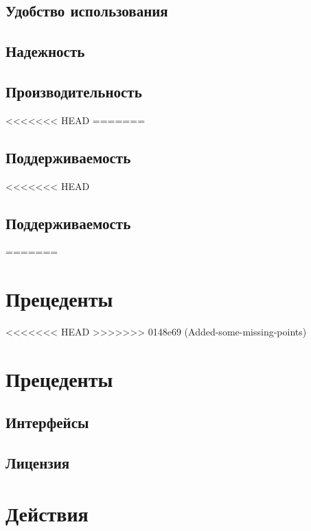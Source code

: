 \documentclass{article}
\begin{document}
\subsection{Удобство использования}


\subsection{Надежность}


\subsection{Производительность}

<<<<<<< HEAD
=======

\subsection{Поддерживаемость}


<<<<<<< HEAD
\subsection{Поддерживаемость}

=======
\section{Прецеденты}
<<<<<<< HEAD
>>>>>>> 0148e69 (Added-some-missing-points)

\section{Прецеденты}
\subsection{Интерфейсы}


\subsection{Лицензия}


\section{Действия}

\end{document}
